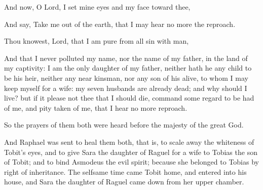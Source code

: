 {\par }{\PP {}And now, O Lord, I set mine eyes and my face toward thee,
\par }{\PP {}And say, Take me out of the earth, that I may hear no more the reproach.
\par }{\PP {}Thou knowest, Lord, that I am pure from all sin with man,
\par }{\PP {}And that I never polluted my name, nor the name of my father, in the land of my captivity: I am the only daughter of my father, neither hath he any child to be his heir, neither any near kinsman, nor any son of his alive, to whom I may keep myself for a wife: my seven husbands are already dead; and why should I live? but if it please not thee that I should die, command some regard to be had of me, and pity taken of me, that I hear no more reproach.
\par }{\PP {}So the prayers of them both were heard before the majesty of the great God.
\par }{\PP {}And Raphael was sent to heal them both, that is, to scale away the whiteness of Tobit’s eyes, and to give Sara the daughter of Raguel for a wife to Tobias the son of Tobit; and to bind Asmodeus the evil spirit; because she belonged to Tobias by right of inheritance. The selfsame time came Tobit home, and entered into his house, and Sara the daughter of Raguel came down from her upper chamber.

}
